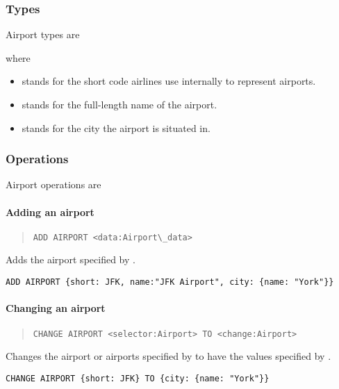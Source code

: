 \subsubsection{Types}
Airport types are
\begin{description}
  \item[] 
  \item[] 
\end{description}
where
\begin{itemize}
  \item {} stands for the short code airlines use internally to
    represent airports.
  \item {} stands for the full-length name of the airport.
  \item {} stands for the city the airport is situated in.
\end{itemize}
\subsubsection{Operations}
Airport operations are
\paragraph{Adding an airport}
\begin{quote}
  \lstinline{ADD AIRPORT <data:Airport\_data>}
\end{quote}
Adds the airport specified by .
\begin{texa}
  \lstinline|ADD AIRPORT {short: JFK, name:"JFK Airport", city: {name: "York"}}|
\end{texa}

\paragraph{Changing an airport}
\begin{quote}
  \lstinline{CHANGE AIRPORT <selector:Airport> TO <change:Airport>}
\end{quote}
Changes the airport or airports specified by  to have the values
specified by
.
\begin{texa}
  \lstinline|CHANGE AIRPORT {short: JFK} TO {city: {name: "York"}}|
\end{texa}

